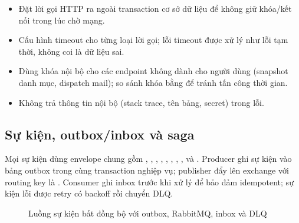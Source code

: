 \begin{itemize}
  \item Đặt lời gọi HTTP ra ngoài transaction cơ sở dữ liệu để không giữ khóa/kết nối trong lúc chờ mạng.
  \item Cấu hình timeout cho từng loại lời gọi; lỗi timeout được xử lý như lỗi tạm thời, không coi là dữ liệu sai.
  \item Dùng khóa nội bộ cho các endpoint không dành cho người dùng (snapshot danh mục, dispatch mail); so sánh khóa bằng  để tránh tấn công thời gian.
  \item Không trả thông tin nội bộ (stack trace, tên bảng, secret) trong lỗi.
\end{itemize}

\subsection{Sự kiện, outbox/inbox và saga}
\label{subsec:events}

Mọi sự kiện dùng envelope chung gồm , , , , , , \hspace{0pt}, ,  và . Producer ghi sự kiện vào bảng outbox trong cùng transaction nghiệp vụ; publisher đẩy lên exchange  với routing key là . Consumer ghi inbox trước khi xử lý để bảo đảm idempotent; sự kiện lỗi được retry có backoff rồi chuyển DLQ.

\begin{figure}[H]
\centering
\resizebox{\textwidth}{!}{}
\caption{Luồng sự kiện bất đồng bộ với outbox, RabbitMQ, inbox và DLQ}
\label{fig:saga-outbox}
\end{figure}


